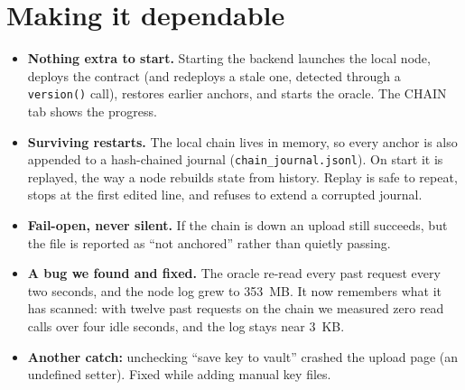 \documentclass[10pt,a4paper]{article}
\newcommand{\code}[1]{\texttt{#1}}
\begin{document}
\section{Making it dependable}
\begin{itemize}
  \item \textbf{Nothing extra to start.} Starting the backend launches the local node, deploys the contract (and redeploys a
        stale one, detected through a \code{version()} call), restores earlier anchors, and starts the oracle. The CHAIN tab shows the progress.
  \item \textbf{Surviving restarts.} The local chain lives in memory, so every anchor is also appended to a hash-chained journal
        (\code{chain\_journal.jsonl}). On start it is replayed, the way a node rebuilds state from history. Replay is safe to repeat,
        stops at the first edited line, and refuses to extend a corrupted journal.
  \item \textbf{Fail-open, never silent.} If the chain is down an upload still succeeds, but the file is reported as
        ``not anchored'' rather than quietly passing.
  \item \textbf{A bug we found and fixed.} The oracle re-read every past request every two seconds, and the node log grew to
        353~MB. It now remembers what it has scanned: with twelve past requests on the chain we measured zero read calls over four idle seconds, and the log stays near 3~KB.
  \item \textbf{Another catch:} unchecking ``save key to vault'' crashed the upload page (an undefined setter). Fixed while adding manual key files.
\end{itemize}

\end{document}
